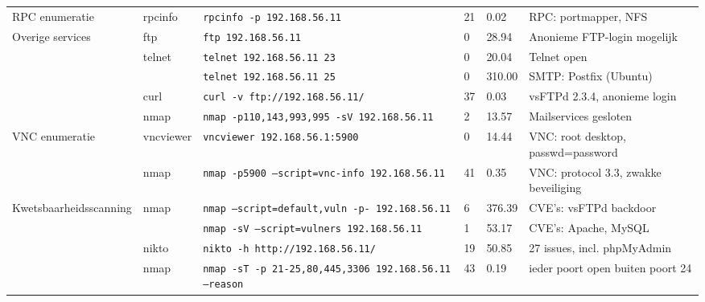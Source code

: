 {\begin{landscape}
\begin{longtable}{lllp{2cm}p{1.2cm}p{4cm}}
RPC enumeratie & rpcinfo & \texttt{rpcinfo -p 192.168.56.11} & 21 & 0.02 & RPC: portmapper, NFS \\
\multirow{5}{*}{Overige services} & ftp & \texttt{ftp 192.168.56.11} & 0 & 28.94 & Anonieme FTP-login mogelijk \\
 & \multirow{2}{*}{telnet} & \texttt{telnet 192.168.56.11 23} & 0 & 20.04 & Telnet open \\
 & & \texttt{telnet 192.168.56.11 25} & 0 & 310.00 & SMTP: Postfix (Ubuntu) \\
 & curl & \texttt{curl -v ftp://192.168.56.11/} & 37 & 0.03 & vsFTPd 2.3.4, anonieme login \\
 & nmap & \texttt{nmap -p110,143,993,995 -sV 192.168.56.11} & 2 & 13.57 & Mailservices gesloten \\
\multirow{2}{*}{VNC enumeratie} & vncviewer & \texttt{vncviewer 192.168.56.1:5900} & 0 & 14.44 & VNC: root desktop, passwd=password \\
 & nmap & \texttt{nmap -p5900 --script=vnc-info 192.168.56.11} & 41 & 0.35 & VNC: protocol 3.3, zwakke beveiliging \\
\multirow{4}{*}{Kwetsbaarheidsscanning} & \multirow{2}{*}{nmap} & \texttt{nmap --script=default,vuln -p- 192.168.56.11} & 6 & 376.39 & CVE's: vsFTPd backdoor \\
 & & \texttt{nmap -sV --script=vulners 192.168.56.11} & 1 & 53.17 & CVE's: Apache, MySQL \\
 & nikto & \texttt{nikto -h http://192.168.56.11/} & 19 & 50.85 & 27 issues, incl. phpMyAdmin \\
 & nmap & \texttt{nmap -sT -p 21-25,80,445,3306 192.168.56.11 --reason} & 43 & 0.19 & ieder poort open buiten poort 24 \\
\end{longtable}
\end{landscape}
}

